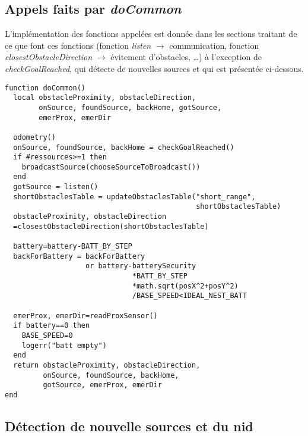 \begin{subappendices}
  \subsection{Appels faits par \emph{doCommon}}

  L'implémentation des fonctions appelées est donnée dans les sections traitant de ce que font ces fonctions (fonction \emph{listen} $\rightarrow$ communication, fonction \emph{closestObstacleDirection} $\rightarrow$ évitement d'obstacles, \ldots) à l'exception de \emph{checkGoalReached}, qui détecte de nouvelles sources et qui est présentée ci-dessous.
\begin{lstlisting}[caption=fonction doCommon]
function doCommon()
  local obstacleProximity, obstacleDirection,
        onSource, foundSource, backHome, gotSource,
        emerProx, emerDir

  odometry()
  onSource, foundSource, backHome = checkGoalReached()
  if #ressources>=1 then
    broadcastSource(chooseSourceToBroadcast())
  end
  gotSource = listen()
  shortObstaclesTable = updateObstaclesTable("short_range",
                                             shortObstaclesTable)
  obstacleProximity, obstacleDirection
  =closestObstacleDirection(shortObstaclesTable)

  battery=battery-BATT_BY_STEP
  backForBattery = backForBattery
                   or battery-batterySecurity
                              *BATT_BY_STEP
                              *math.sqrt(posX^2+posY^2)
                              /BASE_SPEED<IDEAL_NEST_BATT

  emerProx, emerDir=readProxSensor()
  if battery==0 then
    BASE_SPEED=0
    logerr("batt empty")
  end
  return obstacleProximity, obstacleDirection,
         onSource, foundSource, backHome,
         gotSource, emerProx, emerDir
end
\end{lstlisting}

\clearpage
\subsection{Détection de nouvelle sources et du nid}


\end{subappendices}
